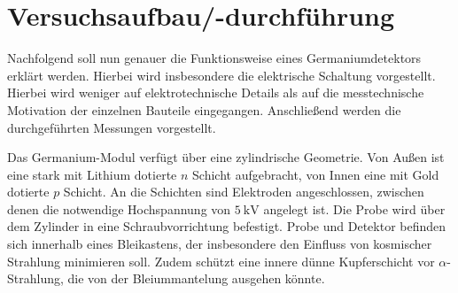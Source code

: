 \section{Versuchsaufbau/-durchführung}
Nachfolgend soll nun genauer die Funktionsweise eines Germaniumdetektors erklärt werden. Hierbei wird insbesondere 
die elektrische Schaltung vorgestellt. Hierbei wird weniger auf elektrotechnische Details 
als auf die messtechnische Motivation der einzelnen Bauteile eingegangen.
Anschließend werden die durchgeführten Messungen vorgestellt.

Das Germanium-Modul verfügt über eine zylindrische Geometrie. Von Außen ist eine stark mit Lithium dotierte $n$
Schicht aufgebracht, von Innen eine mit Gold dotierte $p$ Schicht. An die Schichten sind Elektroden angeschlossen, zwischen denen 
die notwendige Hochspannung von $\SI{5}{\kilo\volt}$ angelegt ist. Die Probe wird über dem Zylinder in eine Schraubvorrichtung 
befestigt. Probe und Detektor befinden sich innerhalb eines Bleikastens, der insbesondere den Einfluss von kosmischer 
Strahlung minimieren soll. Zudem schützt eine innere dünne Kupferschicht vor $\alpha$-Strahlung, die von der Bleiummantelung ausgehen 
könnte. 

